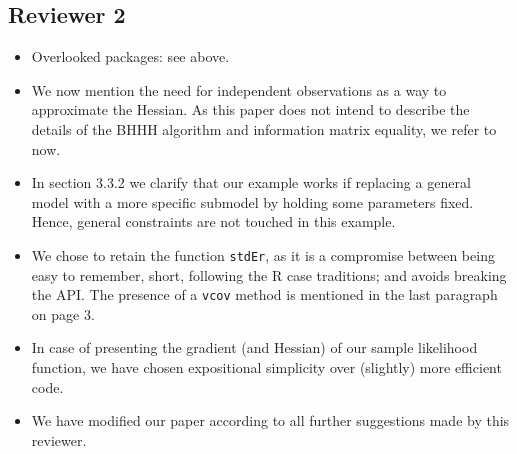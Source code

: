 \documentclass[12pt,parskip=half]{scrartcl}
\begin{document}
\subsection*{Reviewer 2}

\begin{itemize}
\item Overlooked packages: see above.
\item We now mention the need for independent observations as a way to
  approximate the Hessian.
  As this paper does not intend to describe the details of the BHHH algorithm
  and information matrix equality, we refer to \citet[p.~490]{greene08} now.
\item In section 3.3.2 we clarify that our example works if replacing
  a general model with a more specific submodel by holding some parameters fixed.
  Hence, general constraints are not touched in this example.
\item We chose to retain the function \texttt{stdEr}, as it is a
  compromise between being easy to remember, short, following the R
  case traditions; and avoids breaking the API.
  The presence of a \texttt{vcov} method is mentioned in the last paragraph on
  page 3.
\item In case of presenting the gradient (and Hessian) of our sample
  likelihood function, we have chosen expositional simplicity over
  (slightly) more efficient code.
\item We have modified our paper according to all further suggestions
  made by this reviewer.
\end{itemize}



\end{document}
